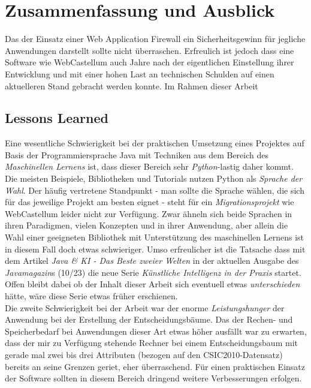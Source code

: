 \chapter{Zusammenfassung und Ausblick}



Das der Einsatz einer Web Application Firewall ein Sicherheitsgewinn für jegliche Anwendungen darstellt sollte nicht überraschen. Erfreulich ist jedoch dass eine Software wie WebCastellum auch Jahre nach der eigentlichen Einstellung ihrer Entwicklung und mit einer hohen Last an technischen Schulden auf einen aktuelleren Stand gebracht werden konnte. Im Rahmen dieser Arbeit 

\section{Lessons Learned}
Eine wesentliche Schwierigkeit bei der praktischen Umsetzung eines Projektes auf Basis der Programmiersprache Java mit Techniken aus dem Bereich des \emph{Maschinellen Lernens} ist, dass dieser Bereich sehr \glqq\emph{Python}\grqq-lastig daher kommt. Die meisten Beispiele, Bibliotheken und Tutorials nutzen Python als \emph{Sprache der Wahl}. Der häufig vertretene Standpunkt - man sollte die Sprache wählen, die sich für das jeweilige Projekt am besten eignet - steht für ein \emph{Migrationsprojekt} wie WebCastellum leider nicht zur Verfügung. Zwar ähneln sich beide Sprachen in ihren Paradigmen, vielen Konzepten und in ihrer Anwendung, aber allein die Wahl einer geeigneten Bibliothek mit Unterstützung des maschinellen Lernens ist in diesem Fall doch etwas schwieriger. Umso erfreulicher ist die Tatsache dass mit dem Artikel \glqq\emph{Java & KI - Das Beste zweier Welten}\grqq{} in der aktuellen Ausgabe des \emph{Javamagazin}s (10/23) die neue Serie \glqq\emph{Künstliche Intelligenz in der Praxis}\grqq{} startet. Offen bleibt dabei ob der Inhalt dieser Arbeit sich eventuell etwas \emph{unterschieden} hätte, wäre diese Serie etwas früher erschienen.\\

Die zweite Schwierigkeit bei der Arbeit war der enorme \emph{Leistungshunger} der Anwendung bei der Erstellung der Entscheidungsbäume. Das der Rechen- und Speicherbedarf bei Anwendungen dieser Art etwas höher ausfällt war zu erwarten, dass der mir zu Verfügung stehende Rechner bei einem Entscheidungsbaum mit gerade mal zwei bis drei Attributen (bezogen auf den CSIC2010-Datensatz) bereits an seine Grenzen geriet, eher überraschend. Für einen praktischen Einsatz der Software sollten in diesem Bereich dringend weitere Verbesserungen erfolgen.

